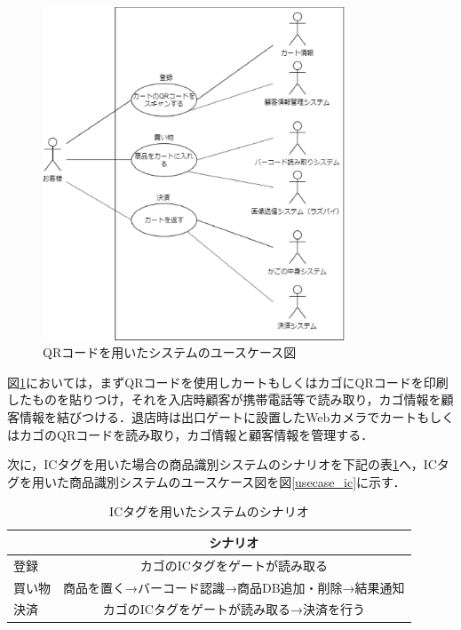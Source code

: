 \begin{figure}[htbp]
\centering
\includegraphics[width = 9cm]{./picture/usecase_qr.eps}
\caption{QRコードを用いたシステムのユースケース図}
\label{usecase_qr}
\end{figure}

図\ref{usecase_qr}においては，まずQRコードを使用しカートもしくはカゴにQRコードを印刷したものを貼りつけ，それを入店時顧客が携帯電話等で読み取り，カゴ情報を顧客情報を結びつける．退店時は出口ゲートに設置したWebカメラでカートもしくはカゴのQRコードを読み取り，カゴ情報と顧客情報を管理する．


次に，ICタグを用いた場合の商品識別システムのシナリオを下記の表\ref{sina_ic}へ，ICタグを用いた商品識別システムのユースケース図を図\ref{usecase_ic}に示す．


\begin{table}[htb]
\begin{center}
\caption{ICタグを用いたシステムのシナリオ}
\begin{tabular}{|l|c|} \hline
 & シナリオ \\ \hline \hline
登録 & カゴのICタグをゲートが読み取る \\
買い物 & 商品を置く→バーコード認識→商品DB追加・削除→結果通知 \\
決済 & カゴのICタグをゲートが読み取る→決済を行う \\ \hline
\end{tabular}
\label{sina_ic}
\end{center}
\end{table}


